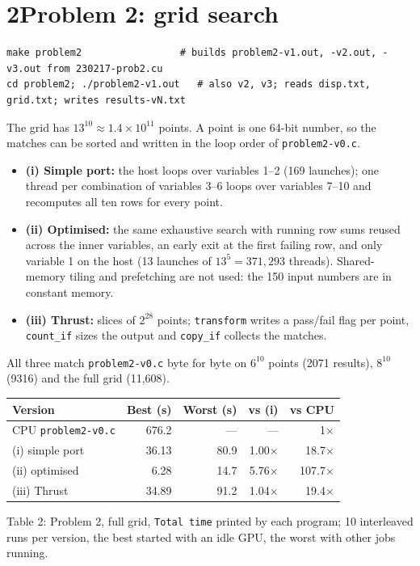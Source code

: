 \documentclass[11pt]{article}
\begin{document}
\section*{2\quad Problem 2: grid search}
\begin{Verbatim}[frame=single,fontsize=\footnotesize]
make problem2                 # builds problem2-v1.out, -v2.out, -v3.out from 230217-prob2.cu
cd problem2; ./problem2-v1.out   # also v2, v3; reads disp.txt, grid.txt; writes results-vN.txt
\end{Verbatim}
The grid has $13^{10}\approx1.4\times10^{11}$ points. A point is one 64-bit number,
so the matches can be sorted and written in the loop order of
\texttt{problem2-v0.c}.
\begin{itemize}
\item \textbf{(i) Simple port:} the host loops over variables 1--2 (169 launches); one
 thread per combination of variables 3--6 loops over variables 7--10 and
 recomputes all ten rows for every point.
\item \textbf{(ii) Optimised:} the same exhaustive search with running row sums reused
 across the inner variables, an early exit at the first failing row, and only
 variable 1 on the host (13 launches of $13^5=371{,}293$ threads). Shared-memory
 tiling and prefetching are not used: the 150 input numbers are in constant memory.
\item \textbf{(iii) Thrust:} slices of $2^{28}$ points; \texttt{transform} writes a
 pass/fail flag per point, \texttt{count\_if} sizes the output and
 \texttt{copy\_if} collects the matches.
\end{itemize}
All three match \texttt{problem2-v0.c} byte for byte on $6^{10}$ points (2071
results), $8^{10}$ (9316) and the full grid (11,608).

\begin{center}
\begin{tabular}{lrrrr}
\toprule
Version & Best (s) & Worst (s) & vs (i) & vs CPU \\
\midrule
CPU \texttt{problem2-v0.c} & 676.2 & --- & --- & 1$\times$ \\
(i) simple port    & 36.13 & 80.9 & 1.00$\times$ & 18.7$\times$ \\
(ii) optimised     & 6.28 & 14.7 & 5.76$\times$ & 107.7$\times$ \\
(iii) Thrust       & 34.89 & 91.2 & 1.04$\times$ & 19.4$\times$ \\
\bottomrule
\end{tabular}

\smallskip
{\small Table 2: Problem 2, full grid, \texttt{Total time} printed by each program; 10 interleaved runs per version, the best started with an idle GPU, the worst with other jobs running.}
\end{center}
\end{document}
